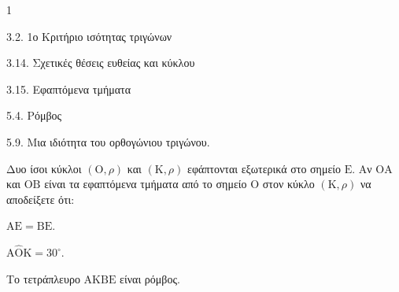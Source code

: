 \begin{ylh}{1}
    \item 3.2. 1ο Κριτήριο ισότητας τριγώνων
    \item 3.14. Σχετικές θέσεις ευθείας και κύκλου
    \item 3.15. Εφαπτόμενα τμήματα
    \item 5.4. Ρόμβος
    \item 5.9. Μια ιδιότητα του ορθογώνιου τριγώνου.
\end{ylh}
Δυο ίσοι κύκλοι $(\mathrm{O}, \rho)$ και $(\mathrm{K}, \rho)$ εφάπτονται εξωτερικά στο σημείο $\mathrm{E}$. Αν $\mathrm{O}\mathrm{A}$ και $\mathrm{O}\mathrm{B}$ είναι τα εφαπτόμενα τμήματα από το σημείο $\mathrm{O}$ στον κύκλο $(\mathrm{K}, \rho)$ να αποδείξετε ότι:
\begin{alist}
    \item $\mathrm{A}\mathrm{E} = \mathrm{B}\mathrm{E}$. 
    \item $\mathrm{A}\hat{\mathrm{O}}\mathrm{K} = 30^\circ$. 
    \item Το τετράπλευρο $\mathrm{A}\mathrm{K}\mathrm{B}\mathrm{E}$ είναι ρόμβος. 
\end{alist}
